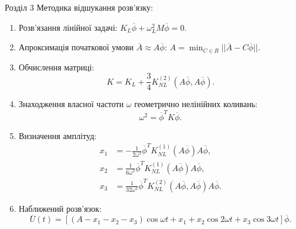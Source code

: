 \documentclass[8pt]{beamer}
\numberwithin{figure}{section}
\numberwithin{equation}{section}
\numberwithin{table}{section}
\begin{document}
\begin{frame}{Розділ 3}
Методика відшукання розв'язку:
\begin{enumerate}
	\item Розв’язання лінійної задачі:
	$K_L\overline{\phi}+\omega_L^2 M \overline{\phi}=0$. 
	\item Апроксимація початкової умови $\overline{A}\approx A\overline{\phi}$: 
	$\displaystyle A=\min_{C \in R} ||\overline{A}-C\overline{\phi}||$.\\
	\item Обчислення матриці:
	\begin{equation}\label{eq:Kmatrix}
	K = K_L + \frac34 K_{NL}^{(2)}\left( A\overline{\phi},A\overline{\phi} \right). 
	\end{equation}
	\item Знаходження власної частоти $\omega$ геометрично нелінійних коливань:
	\begin{equation}\label{eq:omega_nonlin}
	\omega^2=\overline{\phi}^T K \overline{\phi}.
	\end{equation}
	\item Визначення амплітуд:
	 \begin{equation}
 \begin{aligned}
x_1&=-\frac{1}{2\omega ^2}\overline{\phi}^T K_{NL}^{(1)}\left( A\overline{\phi} \right) A\overline{\phi},\\
x_2&=\frac{1}{6\omega ^2}\overline{\phi}^T K_{NL}^{(1)}\left( A\overline{\phi} \right) A\overline{\phi},\\
x_3&=\frac{1}{32\omega ^2}\overline{\phi}^T K_{NL}^{(2)}\left( A\overline{\phi},A\overline{\phi} \right) A\overline{\phi}.
\end{aligned}
	 \end{equation}
	\item Наближений розв'язок:
	\begin{equation}
	\overline{U}\left(t\right)=\left[\left(A-x_1-x_2-x_3\right)\cos \omega t + x_1+x_2\cos 2 \omega t+x_3\cos 3 \omega t\right]\overline{\phi}.
	\end{equation}
\end{enumerate}
\end{frame}
\end{document}
